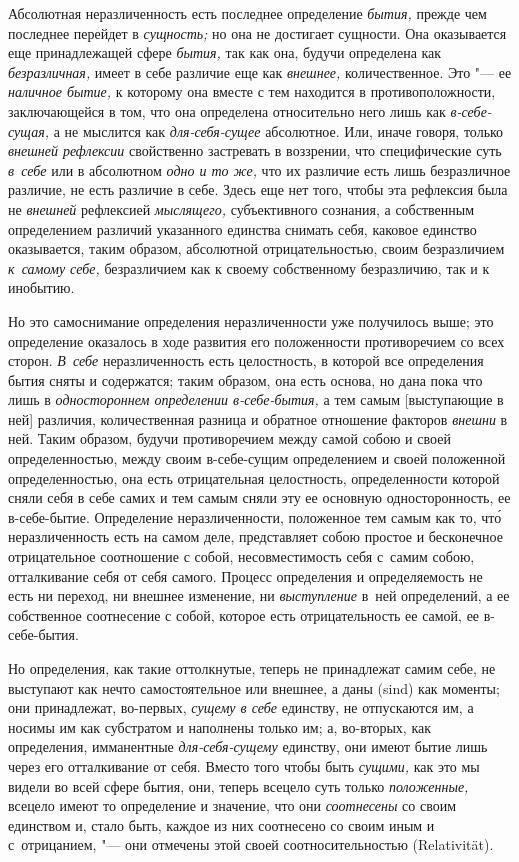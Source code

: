 
Абсолютная неразличенность есть последнее определение {\em бытия,} прежде чем
последнее перейдет в {\em сущность;} но она не достигает сущности. Она
оказывается еще принадлежащей сфере {\em бытия,} так как она, будучи определена
как {\em безразличная,} имеет в себе различие еще как {\em внешнее,}
количественное. Это "--- ее {\em наличное бытие,} к которому она вместе с тем
находится в противоположности, заключающейся в том, что она определена
относительно него лишь как {\em в-себе-сущая,} а не мыслится как
{\em для-себя-сущее} абсолютное. Или, иначе говоря, только
{\em внешней рефлексии} свойственно застревать в воззрении, что специфические
суть {\em в~себе} или в абсолютном {\em одно и то же,} что их различие есть
лишь безразличное различие, не есть различие в себе. Здесь еще нет того, чтобы
эта рефлексия была не {\em внешней} рефлексией {\em мыслящего,} субъективного
сознания, а собственным определением различий указанного единства снимать себя,
каковое единство оказывается, таким образом, абсолютной отрицательностью, своим
безразличием {\em к~самому себе,} безразличием как к своему собственному
безразличию, так и к инобытию.

Но это самоснимание определения неразличенности уже получилось выше; это
определение оказалось в ходе развития его положенности противоречием со всех
сторон. {\em В~себе} неразличенность есть целостность, в которой все
определения бытия сняты и содержатся; таким образом, она есть основа, но дана
пока что лишь в {\em одностороннем определении в-себе-бытия,} а тем самым
[выступающие в ней] различия, количественная разница и обратное отношение
факторов {\em внешни} в ней. Таким образом, будучи противоречием между самой
собою и своей определенностью, между своим в-себе-сущим определением и своей
положенной определенностью, она есть отрицательная целостность, определенности
которой сняли себя в себе самих и тем самым сняли эту ее основную
односторонность, ее в-себе-бытие. Определение неразличенности, положенное тем
самым как то, чт\'{о} неразличенность есть на самом деле, представляет собою
простое и бесконечное отрицательное соотношение с собой, несовместимость себя
с~самим собою, отталкивание себя от себя самого. Процесс определения и
определяемость не есть ни переход, ни внешнее изменение, ни {\em выступление}
в~ней определений, а ее собственное соотнесение с собой, которое есть
отрицательность ее самой, ее в-себе-бытия.

Но определения, как такие оттолкнутые, теперь не принадлежат самим себе, не
выступают как нечто самостоятельное или внешнее, а даны (sind) как моменты; они
принадлежат, во-первых, {\em сущему в себе} единству, не отпускаются им, а
носимы им как субстратом и наполнены только им; а, во-вторых, как определения,
имманентные {\em для-себя-сущему} единству, они имеют бытие лишь через его
отталкивание от себя. Вместо того чтобы быть {\em сущими,} как это мы видели во
всей сфере бытия, они, теперь всецело суть только {\em положенные,} всецело
имеют то определение и значение, что они {\em соотнесены} со своим единством и,
стало быть, каждое из них соотнесено со своим иным и с~отрицанием, "--- они
отмечены этой своей соотносительностью (Rela\-tivi\-tät).

